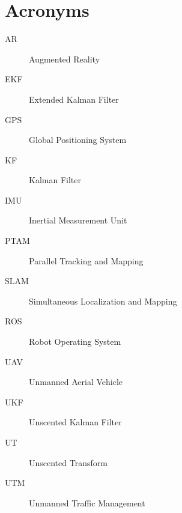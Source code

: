 \chapter*{Acronyms}

\begin{description}
\item [AR] Augmented Reality
\item [EKF] Extended Kalman Filter
\item [GPS] Global Positioning System
\item [KF] Kalman Filter
\item [IMU] Inertial Measurement Unit
\item [PTAM] Parallel Tracking and Mapping
\item [SLAM] Simultaneous Localization and Mapping
\item [ROS] Robot Operating System
\item [UAV] Unmanned Aerial Vehicle
\item [UKF] Unscented Kalman Filter
\item [UT] Unscented Transform
\item [UTM] Unmanned Traffic Management
\end{description}